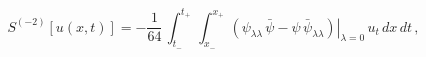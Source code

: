 \begin{equation*}
S^{(-2)}[u(x,t)] = -\frac{1}{64}\,\int_{t_-}^{t_+} \, \int_{x_-}^{x_+}
\,\left.\left( \psi_{\lambda \lambda}
\,\bar{\psi}-\psi\,\bar{\psi}_{\lambda \lambda}
\right)\right|_{\lambda=0}\,u_t\,dx\,dt\,,
\end{equation*}

